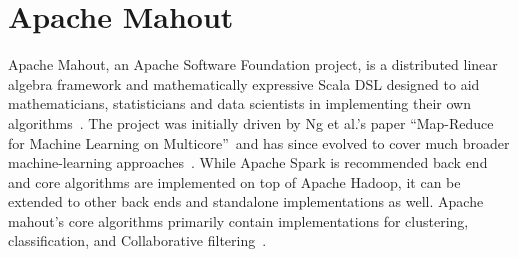 \section{Apache Mahout}

Apache Mahout, an Apache Software Foundation project, is a distributed linear algebra framework and mathematically expressive Scala DSL designed to aid mathematicians, statisticians and data scientists in implementing their own algorithms~\cite{hid-sp18-510-web-Mahout}. The project was initially driven by Ng et al.'s paper ``Map-Reduce for Machine Learning on Multicore''~\cite{hid-sp18-510-ng-Mahout}and has since evolved to cover much broader machine-learning approaches~\cite{hid-sp18-510-ibm-Mahout}. While Apache Spark is recommended back end and core algorithms are implemented on top of Apache Hadoop, it can be extended to other back ends and standalone implementations as well. Apache mahout’s core algorithms primarily contain implementations for clustering, classification, and Collaborative filtering~\cite{hid-sp18-510-wiki-Mahout}.
